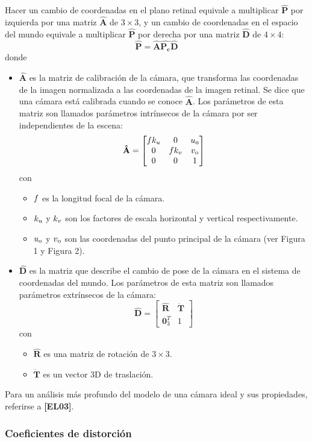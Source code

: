 \documentclass[11pt,a4paper,titlepage]{article}
\newcommand{\Cite}[1]{\textbf{[#1]}}
\newcommand{\Scalar}[1]{\ensuremath{\mathnormal{#1}}}
\newcommand{\Mat}[1]{\ensuremath{\mathbf{\hat{#1}}}}
\newcommand{\ThreeCart}[1]{\ensuremath{\mathbf{\dot{#1}}}}
\newcommand{\Figure}[1]{Figura #1}
\begin{document}
Hacer un cambio de coordenadas en el plano retinal equivale a multiplicar \Mat{P} por izquierda por una matriz \Mat{A} de $3 \times 3$, y un cambio de coordenadas en el espacio del mundo equivale a multiplicar \Mat{P} por derecha por una matriz \Mat{D} de $4 \times 4$:
\[
	\Mat{P} = \Mat{A}\Mat{P_c}\Mat{D}
\]
donde
\begin{itemize}
	\item \Mat{A} es la matriz de calibración de la cámara, que transforma las coordenadas de la imagen normalizada a las coordenadas de la imagen retinal. Se dice que una cámara está calibrada cuando se conoce \Mat{A}. Los parámetros de esta matriz son llamados parámetros intrínsecos de la cámara por ser independientes de la escena:
	\[
		\Mat{A} =
		\begin{bmatrix}
			\Scalar{f} \Scalar{k_u} & 0 & \Scalar{u_0} \\ 
			0 & \Scalar{f} \Scalar{k_v} & \Scalar{v_0} \\ 
			0 & 0 & 1
		\end{bmatrix}
	\]
	con
	\begin{itemize}
		\item \Scalar{f} es la longitud focal de la cámara.
		\item \Scalar{k_u} y \Scalar{k_v} son los factores de escala horizontal y vertical respectivamente.
		\item \Scalar{u_0} y \Scalar{v_0} son las coordenadas del punto principal de la cámara (ver \Figure{1} y \Figure{2}).
	\end{itemize}
	\item \Mat{D} es la matriz que describe el cambio de pose de la cámara en el sistema de coordenadas del mundo. Los parámetros de esta matriz son llamados parámetros extrínsecos de la cámara:
	\[
		\Mat{D} =
		\begin{bmatrix}
			\Mat{R} & \ThreeCart{T} \\ 
			\mathbf{0}^T_3 & 1
		\end{bmatrix}
	\]
	con
	\begin{itemize}
		\item \Mat{R} es una matriz de rotación de $3 \times 3$.
		\item \ThreeCart{T} es un vector 3D de traslación.
	\end{itemize}
\end{itemize}

Para un análisis más profundo del modelo de una cámara ideal y sus propiedades, referirse a \Cite{EL03}.

\subsubsection{Coeficientes de distorción}
\end{document}
